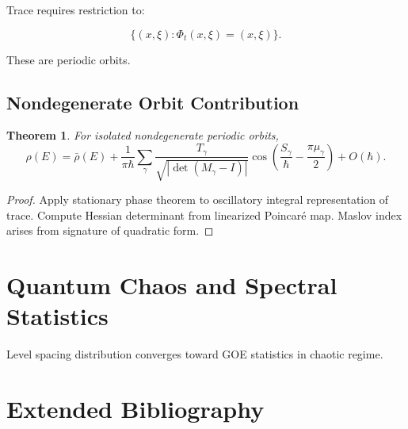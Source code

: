 \documentclass{book}
\newtheorem{theorem}{Theorem}[chapter]
\begin{document}
Trace requires restriction to:

\[
\{(x,\xi):
\Phi_t(x,\xi)=(x,\xi)\}.
\]

These are periodic orbits.

\section{Nondegenerate Orbit Contribution}

\begin{theorem}
For isolated nondegenerate periodic orbits,
\[
\rho(E)
=
\bar\rho(E)
+
\frac1{\pi\hbar}
\sum_\gamma
\frac{T_\gamma}
{\sqrt{|\det(M_\gamma-I)|}}
\cos\left(
\frac{S_\gamma}{\hbar}
-
\frac{\pi\mu_\gamma}{2}
\right)
+ O(\hbar).
\]
\end{theorem}

\begin{proof}
Apply stationary phase theorem to oscillatory integral representation of trace.
Compute Hessian determinant from linearized Poincaré map.
Maslov index arises from signature of quadratic form.
\end{proof}


\chapter{Quantum Chaos and Spectral Statistics}

Level spacing distribution converges toward
GOE statistics in chaotic regime.


\backmatter

\chapter{Extended Bibliography}
\end{document}
